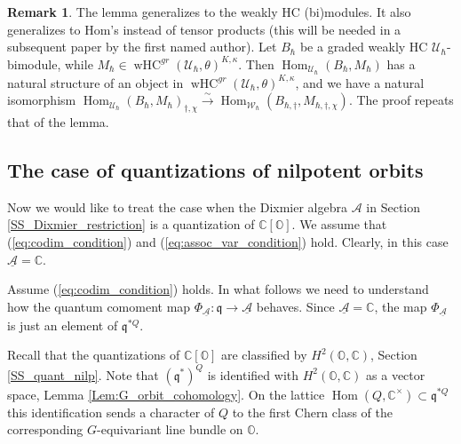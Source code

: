 \documentclass[12pt]{amsart}
\newcommand{\C}{\mathbb{C}}
\newcommand{\A}{\mathcal{A}}
\newcommand{\U}{\mathcal{U}}
\newcommand{\Orb}{\mathbb{O}}
\newcommand{\Walg}{\mathcal{W}}
\newcommand{\q}{\mathfrak{q}}
\newcommand{\wHC}{\operatorname{wHC}}
\newcommand{\Hom}{\operatorname{Hom}}
\theoremstyle{definition}
\newtheorem{Rem}[Thm]{Remark}
\numberwithin{equation}{section}
\begin{document}
\begin{Rem}\label{Rem:restriction_compatibility}
The lemma generalizes to the weakly HC (bi)modules. It also generalizes to Hom's instead of tensor
products (this will be needed in a subsequent paper by the first named author). Let $B_\hbar$
be a graded weakly HC $\U_\hbar$-bimodule, while $M_\hbar\in \wHC^{gr}(\U_\hbar,\theta)^{K,\kappa}$.
Then $\Hom_{\U_\hbar}(B_\hbar,M_\hbar)$ has a natural structure of an object in
$\wHC^{gr}(\U_\hbar,\theta)^{K,\kappa}$, and we have a natural isomorphism
$\Hom_{\U_\hbar}(B_\hbar,M_\hbar)_{\dagger,\chi}\xrightarrow{\sim}\Hom_{\Walg_\hbar}(B_{\hbar,\dagger},
M_{\hbar,\dagger,\chi})$. The proof repeats that of the lemma.
\end{Rem}

\subsection{The case of quantizations of nilpotent orbits}\label{subsec:W-algebra_nilpotent}
Now we would like to treat the case when the Dixmier algebra $\A$ in
Section \ref{SS_Dixmier_restriction} is a quantization of
$\C[\Orb]$. We assume that (\ref{eq:codim_condition}) and (\ref{eq:assoc_var_condition}) hold. Clearly, in this case $\underline{\A}=\C$.

Assume (\ref{eq:codim_condition}) holds.
In what follows we need to understand how the quantum comoment map
$\Phi_{\underline{\A}}:\q\rightarrow \underline{\A}$ behaves. Since $\underline{\A}=\C$,
the map $\Phi_{\underline{\A}}$ is just an element of $\q^{*Q}$.

Recall that the quantizations of $\C[\Orb]$ are classified by $H^2(\Orb,\C)$,
Section \ref{SS_quant_nilp}.
Note that $(\q^*)^Q$  is identified with $H^2(\Orb,\C)$ as a vector space, Lemma \ref{Lem:G_orbit_cohomology}.
On the lattice $\Hom(Q,\C^\times)\subset \q^{*Q}$ this identification sends
a character of $Q$ to the first Chern class of the corresponding $G$-equivariant line  bundle
on $\Orb$.
\end{document}
